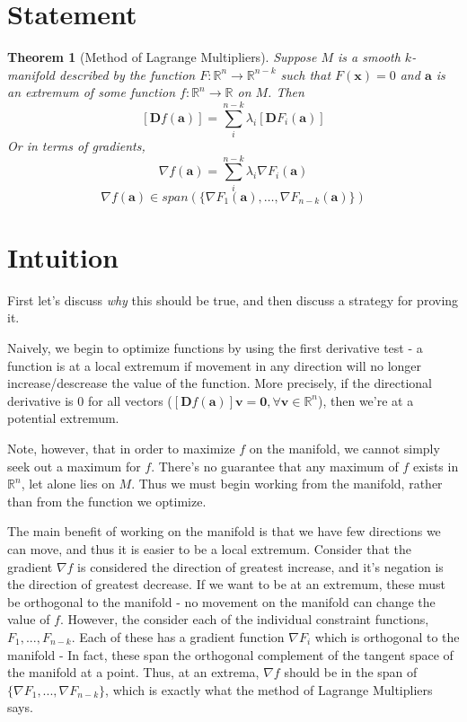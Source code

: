 \documentclass[11pt]{article}
\newtheorem{theorem}{Theorem}[section]
\theoremstyle{definition}
\begin{document}
\section{Statement}
\begin{theorem}[Method of Lagrange Multipliers]
    Suppose $M$ is a smooth $k$-manifold described by the function $F: \mathbb{R}^n \rightarrow \mathbb{R}^{n-k}$
    such that $F(\mathbf{x}) = 0$ and $\mathbf{a}$ is an extremum of some function  $f: \mathbb{R}^n 
    \rightarrow \mathbb{R}$ on $M$. Then
    \[ \left[ \mathbf{D}f(\mathbf{a}) \right] = \sum_i^{n-k} \lambda_i \left[\mathbf{D}F_i(\mathbf{a})\right] \]
    Or in terms of gradients,
    \[ \nabla f(\mathbf{a}) = \sum_i^{n-k} \lambda_i \nabla F_i(\mathbf{a}) \]
    \[ \nabla f(\mathbf{a}) \in span\left(\{\nabla F_1(\mathbf{a}), \dots,\nabla F_{n-k}(\mathbf{a})\}\right) \]
\end{theorem}

\section{Intuition}
First let's discuss \textit{why} this should be true, and then discuss a strategy for proving it. 

Naively, we begin to optimize functions by using the first derivative test - a function is at a local
extremum if movement in any direction will no longer increase/descrease the value of the function. 
More precisely, if the directional derivative is $0$ for all vectors ($[\mathbf{D}f(\mathbf{a})]\mathbf{v} = \mathbf{0}, \forall \mathbf{v} \in \mathbb{R}^n$), then we're at a potential extremum.

Note, however, that in order to maximize $f$ on the manifold, we cannot simply seek out a maximum for $f$.
There's no guarantee that any maximum of $f$ exists in $\mathbb{R}^n$, let alone lies on $M$. Thus we must begin
working from the manifold, rather than from the function we optimize. 

The main benefit of working on the manifold is that we have few directions we can move, and thus it is easier 
to be a local extremum. Consider that the gradient $\nabla f$ is considered the direction of greatest 
increase, and it's negation is the direction of greatest decrease. If we want to be at an extremum, these must 
be orthogonal to the manifold - no movement on the manifold can change the value of $f$. However, the consider 
each of the  individual constraint functions, $F_1, ..., F_{n-k}$. Each of these has a gradient function 
$\nabla F_i$ which is orthogonal to the manifold - In fact, these span the orthogonal complement of the
tangent space of the manifold at a point. Thus, at an extrema, $\nabla f$ should be in the span of 
$\{ \nabla F_1, ..., \nabla F_{n-k} \}$, which is exactly what the method of Lagrange Multipliers 
says.
\end{document}
